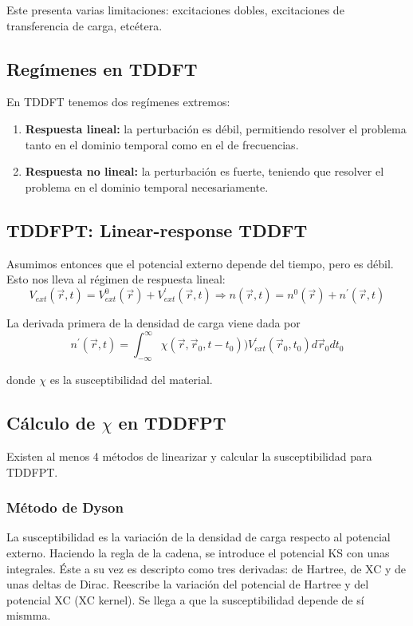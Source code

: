   Este presenta varias limitaciones: excitaciones dobles, excitaciones de transferencia de carga, etcétera.

\subsection{Regímenes en TDDFT}

  En TDDFT tenemos dos regímenes extremos:
    \begin{enumerate}
      \item \textbf{Respuesta lineal:} la perturbación es débil, permitiendo resolver el problema tanto en el dominio temporal como en el de frecuencias.
      \item \textbf{Respuesta no lineal:} la perturbación es fuerte, teniendo que resolver el problema en el dominio temporal necesariamente.
    \end{enumerate}

\subsection{TDDFPT: Linear-response TDDFT}

  Asumimos entonces que el potencial externo depende del tiempo, pero es débil. Esto nos lleva al régimen de respuesta lineal:
    $$V_{ext} (\vec{r}, t) = V_{ext}^0 (\vec{r}) + V_{ext}^{'} (\vec{r}, t)
    \Rightarrow
    n (\vec{r}, t) = n^0 (\vec{r}) + n^{'} (\vec{r}, t)$$

  La derivada primera de la densidad de carga viene dada por
    $$n^{'} (\vec{r}, t) = \int_{-\infty}^{\infty} \chi (\vec{r}, \vec{r}_0, t-t_0)) V_{ext}^{'} (\vec{r}_0, t_0) d \vec{r}_0 d t_0$$

  donde $\chi$ es la susceptibilidad del material.

\subsection{Cálculo de $\chi$ en TDDFPT}

  Existen al menos 4 métodos de linearizar y calcular la susceptibilidad para TDDFPT.

\subsubsection{Método de Dyson}

  La susceptibilidad es la variación de la densidad de carga respecto al potencial externo. Haciendo la regla de la cadena, se introduce el potencial KS con unas integrales. Éste a su vez es descripto como tres derivadas: de Hartree, de XC y de unas deltas de Dirac. Reescribe la variación del potencial de Hartree y del potencial XC (XC kernel). Se llega a que la susceptibilidad depende de sí mismma.

